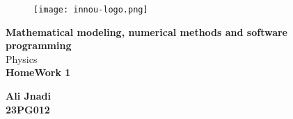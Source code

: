 \begin{titlepage}
    \begin{figure}[t]
        \centering\texttt{[image: innou-logo.png]}
    \end{figure}
    \vspace{20mm}
    
    \begin{Large}
     \begin{center}
        \textbf{Mathematical modeling, numerical methods and software programming\\}
        \vspace{20mm}
        {\LARGE{Physics}}\\
        \vspace{10mm}
        {\huge{\bf HomeWork 1}}\\
    \end{center}
    \end{Large}
    
    
    \vspace{36mm}
    
    \begin{center}
        {\large{\bf Ali Jnadi \\23PG012}}
    \end{center}
        
    
    \vspace{25mm}
    
    \hrulefill
    
    \vspace{5mm}
    \end{titlepage}